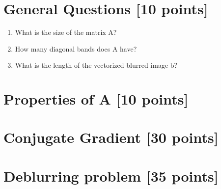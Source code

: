 \documentclass[unicode,11pt,a4paper,oneside,numbers=endperiod,openany]{scrartcl}
\begin{document}
\setassignment
{}

\newline

\assignmentpolicy


\newpage

\section{General Questions [10 points]}

\begin{enumerate}
 \item What is the size of the matrix A?
 
 \item How many diagonal bands does A have?
 
 \item What is the length of the vectorized blurred image b?
\end{enumerate}


\section{Properties of A [10 points]}

\section{Conjugate Gradient [30 points]}

\section{Deblurring problem [35 points]}
\end{document}
